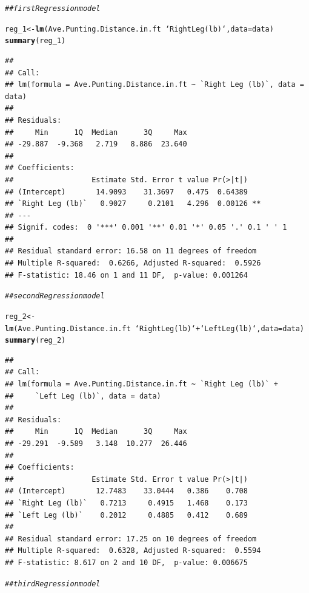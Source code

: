 \documentclass{article}\usepackage[]{graphicx}\usepackage[]{color}
\makeatletter
\newcommand{\hlcom}[1]{\textcolor[rgb]{0.678,0.584,0.686}{\textit{#1}}}%
\newcommand{\hlopt}[1]{\textcolor[rgb]{0,0,0}{#1}}%
\newcommand{\hlstd}[1]{\textcolor[rgb]{0.345,0.345,0.345}{#1}}%
\newcommand{\hlkwb}[1]{\textcolor[rgb]{0.69,0.353,0.396}{#1}}%
\newcommand{\hlkwc}[1]{\textcolor[rgb]{0.333,0.667,0.333}{#1}}%
\newcommand{\hlkwd}[1]{\textcolor[rgb]{0.737,0.353,0.396}{\textbf{#1}}}%
\newenvironment{kframe}{%
 \def\at@end@of@kframe{}%
 \ifinner\ifhmode%
  \def\at@end@of@kframe{\end{minipage}}%
  \begin{minipage}{\columnwidth}%
 \fi\fi%
 \def\FrameCommand##1{\hskip\@totalleftmargin \hskip-\fboxsep
 \colorbox{shadecolor}{##1}\hskip-\fboxsep
     \hskip-\linewidth \hskip-\@totalleftmargin \hskip\columnwidth}%
 \MakeFramed {\advance\hsize-\width
   \@totalleftmargin\z@ \linewidth\hsize
   \@setminipage}}%
 {\par\unskip\endMakeFramed%
 \at@end@of@kframe}
\newenvironment{knitrout}{}{} %
\makeatother
\begin{document}
\begin{knitrout}
\begin{kframe}
\begin{alltt}
\hlcom{## first Regression model}

\hlstd{reg_1} \hlkwb{<-} \hlkwd{lm}\hlstd{(Ave.Punting.Distance.in.ft}\hlopt{~} \hlstd{`Right Leg (lb)`,}\hlkwc{data}\hlstd{=data)}
\hlkwd{summary}\hlstd{(reg_1)}
\end{alltt}
\begin{verbatim}
## 
## Call:
## lm(formula = Ave.Punting.Distance.in.ft ~ `Right Leg (lb)`, data = data)
## 
## Residuals:
##     Min      1Q  Median      3Q     Max 
## -29.887  -9.368   2.719   8.886  23.640 
## 
## Coefficients:
##                  Estimate Std. Error t value Pr(>|t|)   
## (Intercept)       14.9093    31.3697   0.475  0.64389   
## `Right Leg (lb)`   0.9027     0.2101   4.296  0.00126 **
## ---
## Signif. codes:  0 '***' 0.001 '**' 0.01 '*' 0.05 '.' 0.1 ' ' 1
## 
## Residual standard error: 16.58 on 11 degrees of freedom
## Multiple R-squared:  0.6266,	Adjusted R-squared:  0.5926 
## F-statistic: 18.46 on 1 and 11 DF,  p-value: 0.001264
\end{verbatim}
\begin{alltt}
\hlcom{## second Regression model}

\hlstd{reg_2}\hlkwb{<-}\hlkwd{lm}\hlstd{(Ave.Punting.Distance.in.ft}\hlopt{~}\hlstd{`Right Leg (lb)`} \hlopt{+} \hlstd{`Left Leg (lb)`,}\hlkwc{data}\hlstd{=data)}
\hlkwd{summary}\hlstd{(reg_2)}
\end{alltt}
\begin{verbatim}
## 
## Call:
## lm(formula = Ave.Punting.Distance.in.ft ~ `Right Leg (lb)` + 
##     `Left Leg (lb)`, data = data)
## 
## Residuals:
##     Min      1Q  Median      3Q     Max 
## -29.291  -9.589   3.148  10.277  26.446 
## 
## Coefficients:
##                  Estimate Std. Error t value Pr(>|t|)
## (Intercept)       12.7483    33.0444   0.386    0.708
## `Right Leg (lb)`   0.7213     0.4915   1.468    0.173
## `Left Leg (lb)`    0.2012     0.4885   0.412    0.689
## 
## Residual standard error: 17.25 on 10 degrees of freedom
## Multiple R-squared:  0.6328,	Adjusted R-squared:  0.5594 
## F-statistic: 8.617 on 2 and 10 DF,  p-value: 0.006675
\end{verbatim}
\begin{alltt}
\hlcom{## third Regression model}


\end{alltt}
\end{kframe}
\end{knitrout}
\end{document}
